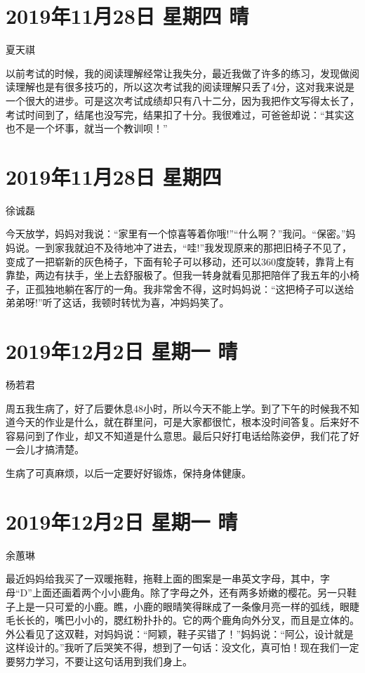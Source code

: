 \section{2019年11月28日 星期四 晴}

夏天祺

以前考试的时候，我的阅读理解经常让我失分，最近我做了许多的练习，发现做阅读理解也是有很多技巧的，所以这次考试我的阅读理解只丢了4分，这对我来说是一个很大的进步。可是这次考试成绩却只有八十二分，因为我把作文写得太长了，考试时间到了，结尾也没写完，结果扣了十分。我很难过，可爸爸却说：``其实这也不是一个坏事，就当一个教训呗！''

\section{2019年11月28日 星期四}

徐诚磊

今天放学，妈妈对我说：``家里有一个惊喜等着你哦!''``什么啊？''我问。``保密。''妈妈说。一到家我就迫不及待地冲了进去，``哇!''我发现原来的那把旧椅子不见了，变成了一把崭新的灰色椅子，下面有轮子可以移动，还可以360度旋转，靠背上有靠垫，两边有扶手，坐上去舒服极了。但我一转身就看见那把陪伴了我五年的小椅子，正孤独地躺在客厅的一角。我非常舍不得，这时妈妈说：``这把椅子可以送给弟弟呀!''听了这话，我顿时转忧为喜，冲妈妈笑了。

\section{2019年12月2日 星期一 晴}

杨若君

周五我生病了，好了后要休息48小时，所以今天不能上学。到了下午的时候我不知道今天的作业是什么，就在群里问，可是大家都很忙，根本没时间答复。后来好不容易问到了作业，却又不知道是什么意思。最后只好打电话给陈姿伊，我们花了好一会儿才搞清楚。

生病了可真麻烦，以后一定要好好锻炼，保持身体健康。

\section{2019年12月2日 星期一 晴}

余蕙琳

最近妈妈给我买了一双暖拖鞋，拖鞋上面的图案是一串英文字母，其中，字母``D''上面还画着两个小小鹿角。除了字母之外，还有两多娇嫩的樱花。另一只鞋子上是一只可爱的小鹿。瞧，小鹿的眼晴笑得眯成了一条像月亮一样的弧线，眼睫毛长长的，嘴巴小小的，腮红粉扑扑的。它的两个鹿角向外分叉，而且是立体的。外公看见了这双鞋，对妈妈说：``阿颖，鞋子买错了！''妈妈说：``阿公，设计就是这样设计的。''我听了后哭笑不得，想到了一句话：没文化，真可怕！现在我们一定要努力学习，不要让这句话用到我们身上。

